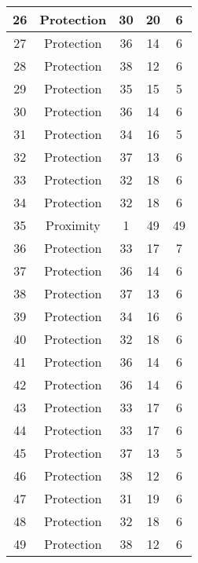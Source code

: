 \documentclass[results.tex]{subfiles}
\begin{document}
\begin{center}
\begin{tabular}{| c || c | c | c | c |}
    \hline
    26 & Protection & 30 & 20 & 6 \\ 
    \hline
    27 & Protection & 36 & 14 & 6 \\ 
    \hline
    28 & Protection & 38 & 12 & 6 \\ 
    \hline
    29 & Protection & 35 & 15 & 5 \\ 
    \hline
    30 & Protection & 36 & 14 & 6 \\ 
    \hline
    31 & Protection & 34 & 16 & 5 \\ 
    \hline
    32 & Protection & 37 & 13 & 6 \\ 
    \hline
    33 & Protection & 32 & 18 & 6 \\ 
    \hline
    34 & Protection & 32 & 18 & 6 \\ 
    \hline
    35 & Proximity & 1 & 49 & 49 \\ 
    \hline
    36 & Protection & 33 & 17 & 7 \\ 
    \hline
    37 & Protection & 36 & 14 & 6 \\ 
    \hline
    38 & Protection & 37 & 13 & 6 \\ 
    \hline
    39 & Protection & 34 & 16 & 6 \\ 
    \hline
    40 & Protection & 32 & 18 & 6 \\ 
    \hline
    41 & Protection & 36 & 14 & 6 \\ 
    \hline
    42 & Protection & 36 & 14 & 6 \\ 
    \hline
    43 & Protection & 33 & 17 & 6 \\ 
    \hline
    44 & Protection & 33 & 17 & 6 \\ 
    \hline
    45 & Protection & 37 & 13 & 5 \\ 
    \hline
    46 & Protection & 38 & 12 & 6 \\ 
    \hline
    47 & Protection & 31 & 19 & 6 \\ 
    \hline
    48 & Protection & 32 & 18 & 6 \\ 
    \hline
    49 & Protection & 38 & 12 & 6 \\ 
    \hline   \end{tabular}
\end{center}
\end{document}
